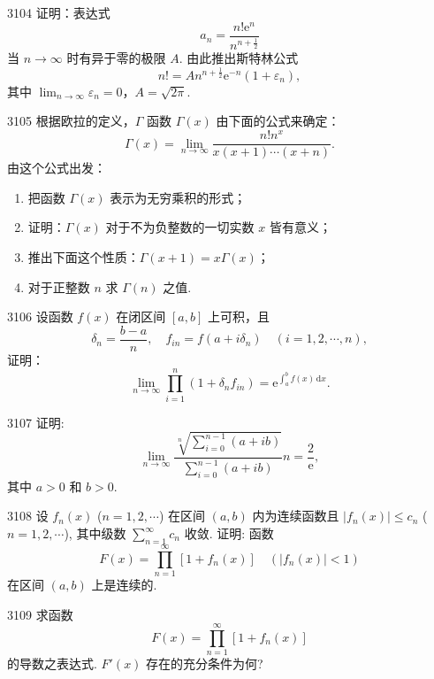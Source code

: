 \begin{prob}[L]{3104}
证明：表达式
\[
a_{n} = \frac{n!\mathrm{e}^{n}}{n^{n+\frac{1}{2}}}
\]
当 $n \to \infty$ 时有异于零的极限 $A$. 由此推出斯特林公式
\[
n! = A n^{n+\frac{1}{2}} \mathrm{e}^{-n} (1 + \varepsilon_{n}),
\]
其中 $\lim_{n\to\infty} \varepsilon_{n} = 0$，$A = \sqrt{2\pi}$.
\end{prob}

\begin{prob}[L]{3105}
根据欧拉的定义，$\Gamma$ 函数 $\Gamma(x)$ 由下面的公式来确定：
\[
\Gamma(x) = \lim_{n\to\infty} \frac{n! n^{x}}{x(x+1)\cdots(x+n)}.
\]
由这个公式出发：
\begin{enumerate}[label=(\alph*), itemsep=2pt, topsep=3pt]
\item 把函数 $\Gamma(x)$ 表示为无穷乘积的形式；
\item 证明：$\Gamma(x)$ 对于不为负整数的一切实数 $x$ 皆有意义；
\item 推出下面这个性质：$\Gamma(x+1) = x\Gamma(x)$；
\item 对于正整数 $n$ 求 $\Gamma(n)$ 之值.
\end{enumerate}
\end{prob}

\begin{prob}[M]{3106}
设函数 $f(x)$ 在闭区间 $[a, b]$ 上可积，且
\[
\delta_{n} = \frac{b-a}{n}, \quad f_{in} = f(a + i\delta_{n}) \quad (i = 1, 2, \cdots, n),
\]
证明：
\[
\lim_{n\to\infty} \prod_{i=1}^{n} (1 + \delta_{n} f_{in}) = \mathrm{e}^{\int_{a}^{b} f(x)\,\mathrm{d}x}.
\]
\end{prob}

\begin{prob}[M]{3107}
证明:
\[
\lim_{n \to \infty} \frac{\sqrt[n]{\displaystyle\sum_{i=0}^{n-1} (a + ib)}}{\displaystyle\sum_{i=0}^{n-1} (a + ib)} n = \frac{2}{\mathrm{e}},
\]
其中 $a > 0$ 和 $b > 0$.
\end{prob}

\begin{prob}[M]{3108}
设 $f_n(x)$ ($n = 1, 2, \cdots$) 在区间 $(a, b)$ 内为连续函数且 $|f_n(x)| \leqslant c_n$ ($n = 1, 2, \cdots$), 其中级数 $\sum_{n=1}^{\infty} c_n$ 收敛. 证明: 函数
\[
F(x) = \prod_{n=1}^{\infty} [1 + f_n(x)] \quad (|f_n(x)| < 1)
\]
在区间 $(a, b)$ 上是连续的.
\end{prob}

\begin{prob}[M]{3109}
求函数
\[
F(x) = \prod_{n=1}^{\infty} [1 + f_n(x)]
\]
的导数之表达式. $F'(x)$ 存在的充分条件为何?
\end{prob}

